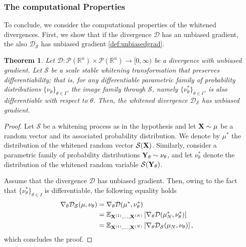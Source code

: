 \documentclass{article}
\renewcommand{\to}{\rightarrow}
\def\DDSS{\mathcal{D}_\mathcal{S}}
\def\bX{{\bf X}}
\def\bY{{\bf Y}}
\def \PP{\mathcal{P}}
\def \erre{\mathbb{R}}
\newtheorem{theorem}{Theorem}
\newtheorem{proof}{Proof}
\begin{document}
\subsubsection{The computational Properties}

% 
To conclude, we consider the computational properties of the whitened divergences.
% 
First, we show that if the divergence $\mathcal{D}$ has an unbiased gradient, the also $\DDSS$ has unbiased gradient \eqref{def:unbiasedgrad}.
% 

\begin{theorem}
\label{thm:preserveunbiasedgrad}
    Let $\mathcal{D}:\PP(\erre^n)\times\PP(\erre^n)\to[0,\infty)$ be a divergence with unbiased gradient.
    Let $\mathcal{S}$ be a scale stable whitening transformation that preserves differentiability; that is, for any differentiable parametric family of probability distributions $\{\nu_\theta\}_{\theta \in I}$, the image family through $\mathcal{S}$, namely $\{\nu_\theta^*\}_{\theta \in I}$, is also differentiable with respect to $\theta$.
    Then, the whitened divergence $\DDSS$ has unbiased gradient.
\end{theorem}

\begin{proof}
Let $\mathcal{S}$ be a whitening process as in the hypothesis and let $\bX \sim \mu$ be a random vector and its associated probability distribution.
% 
We denote by $\mu^*$ the distribution of the whitened random vector $\mathcal{S}(\bX)$. 
% 
Similarly, consider a parametric family of probability distributions $\bY_\theta \sim \nu_\theta$, and let $\nu^*_\theta$ denote the distribution of the whitened random variable $\mathcal{S}(\bY_\theta)$.
% 

% 
Assume that the divergence $\mathcal{D}$ has unbiased gradient.
% 
Then, owing to the fact that $\{\nu_\theta^*\}_{\theta\in I}$ is differentiable, the following equality holds
% 
\begin{align*}
    \nabla_{\theta} \DDSS(\mu, \nu_\theta) &= \nabla_{\theta} \mathcal{D}(\mu^*, \nu_\theta^*)\\
    &= \mathbb{E}_{\bX^{(1)}, \dots, \bX^{(N)}}\left[ \nabla_{\theta} \mathcal{D}({\mu}_N^*, \nu_\theta^*) \right]\\
    &= \mathbb{E}_{\bX^{(1)}, \dots, \bX^{(N)}}\left[ \nabla_{\theta} \DDSS({\mu}_N, \nu_\theta) \right],
\end{align*}
% 
which concludes the proof.
\end{proof}
\end{document}
